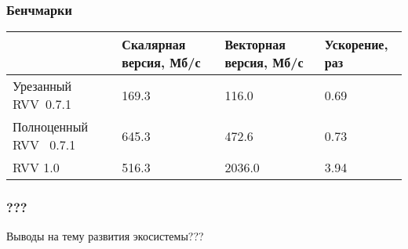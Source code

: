\documentclass[aspectratio=169, handout]{beamer}
\begin{document}
\begin{frame}
    \frametitle{Бенчмарки}

    \begin{center}
        \begin{tabularx}{\textwidth}{YZZZ}
            \toprule
                                   & Скалярная версия, Мб/с & Векторная версия, Мб/с & Ускорение, раз \\
            \midrule
            Урезанный RVV~0.7.1    & 169.3                  & 116.0                  & 0.69           \\
            \midrule
            Полноценный RVV~ 0.7.1 & 645.3                  & 472.6                  & 0.73           \\
            \midrule
            RVV 1.0                & 516.3                  & 2036.0                 & 3.94           \\
            \bottomrule
        \end{tabularx}
    \end{center}

\end{frame}

\begin{frame}
    \frametitle{???}

    Выводы на тему развития экосистемы???

\end{frame}














\end{document}
